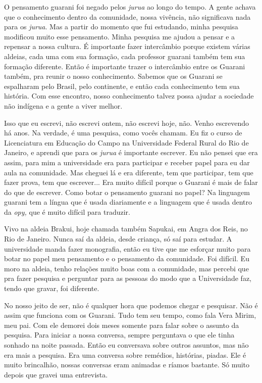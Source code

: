 O pensamento guarani foi negado pelos \emph{jurua} ao longo do tempo. A
gente achava que o conhecimento dentro da comunidade, nossa vivência,
não significava nada para os \emph{jurua}. Mas a partir do momento que
fui estudando, minha pesquisa modificou muito esse pensamento. Minha
pesquisa me ajudou a pensar e a repensar a nossa cultura. É importante
fazer intercâmbio porque existem várias aldeias, cada uma com sua
formação, cada professor guarani também tem sua formação diferente.
Então é importante trazer o intercâmbio entre os Guarani também, pra
reunir o nosso conhecimento. Sabemos que os Guarani se espalharam pelo
Brasil, pelo continente, e então cada conhecimento tem sua história. Com
esse encontro, nosso conhecimento talvez possa ajudar a sociedade não
indígena e a gente a viver melhor.

Isso que eu escrevi, não escrevi ontem, não escrevi hoje, não. Venho
escrevendo há anos. Na verdade, é uma pesquisa, como vocês chamam. Eu
fiz o curso de Licenciatura em Educação do Campo na Universidade Federal
Rural do Rio de Janeiro, e aprendi que para os \emph{jurua} é importante
escrever. Eu não pensei que era assim, para mim a universidade era para
participar e receber papel para eu dar aula na comunidade. Mas cheguei
lá e era diferente, tem que participar, tem que fazer prova, tem que
escrever... Era muito difícil porque o Guarani é mais de falar do que de
escrever. Como botar o pensamento guarani no papel? Na linguagem guarani
tem a língua que é usada diariamente e a linguagem que é usada dentro da
\emph{opy,} que é muito difícil para traduzir.

Vivo na aldeia Brakui, hoje chamada também Sapukai, em Angra dos Reis,
no Rio de Janeiro. Nunca saí da aldeia, desde criança, só saí para
estudar. A universidade manda fazer monografia, então eu tive que me
esforçar muito para botar no papel meu pensamento e o pensamento da
comunidade. Foi difícil. Eu moro na aldeia, tenho relações muito boas
com a comunidade, mas percebi que pra fazer pesquisa e perguntar para as
pessoas do modo que a Universidade faz, tendo que gravar, foi diferente.

No nosso jeito de ser, não é qualquer hora que podemos chegar e
pesquisar. Não é assim que funciona com os Guarani. Tudo tem seu tempo,
como fala Vera Mirim, meu pai. Com ele demorei dois meses somente para
falar sobre o assunto da pesquisa. Para iniciar a nossa conversa, sempre
perguntava o que ele tinha sonhado na noite passada. Então eu conversava
sobre outros assuntos, mas não era mais a pesquisa. Era uma conversa
sobre remédios, histórias, piadas. Ele é muito brincalhão, nossas
conversas eram animadas e ríamos bastante. Só muito depois que gravei
uma entrevista.


